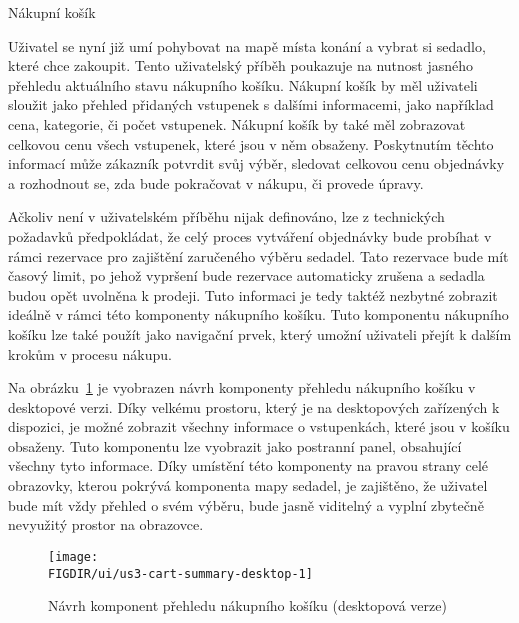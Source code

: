 \begin{subsection}{Nákupní košík}
    \label{subsec:narvh-ui-transformace-uzivatelskych-pribehu-nakupni-kosik}
    \userstoryshoppingcart

    Uživatel se nyní již umí pohybovat na mapě místa konání a vybrat si sedadlo, které chce zakoupit.
    Tento uživatelský příběh poukazuje na nutnost jasného přehledu aktuálního stavu nákupního košíku.
    Nákupní košík by měl uživateli sloužit jako přehled přidaných vstupenek s dalšími informacemi, jako například cena, kategorie, či počet vstupenek.
    Nákupní košík by také měl zobrazovat celkovou cenu všech vstupenek, které jsou v něm obsaženy.
    Poskytnutím těchto informací může zákazník potvrdit svůj výběr, sledovat celkovou cenu objednávky a rozhodnout se, zda bude pokračovat v nákupu, či provede úpravy.

    Ačkoliv není v uživatelském příběhu nijak definováno, lze z technických požadavků předpokládat, že celý proces vytváření objednávky bude probíhat v rámci rezervace pro zajištění zaručeného výběru sedadel.
    Tato rezervace bude mít časový limit, po jehož vypršení bude rezervace automaticky zrušena a sedadla budou opět uvolněna k prodeji.
    Tuto informaci je tedy taktéž nezbytné zobrazit ideálně v rámci této komponenty nákupního košíku.
    Tuto komponentu nákupního košíku lze také použít jako navigační prvek, který umožní uživateli přejít k dalším krokům v procesu nákupu.

    Na obrázku~\ref{fig:us3-cart-summary-desktop} je vyobrazen návrh komponenty přehledu nákupního košíku v desktopové verzi.
    Díky velkému prostoru, který je na desktopových zařízených k dispozici, je možné zobrazit všechny informace o vstupenkách, které jsou v košíku obsaženy.
    Tuto komponentu lze vyobrazit jako postranní panel, obsahující všechny tyto informace.
    Díky umístění této komponenty na pravou strany celé obrazovky, kterou pokrývá komponenta mapy sedadel, je zajištěno, že uživatel bude mít vždy přehled o svém výběru, bude jasně viditelný a vyplní zbytečně nevyužitý prostor na obrazovce.

    \begin{figure}[H]
        \centering
        \caption{Návrh komponent přehledu nákupního košíku (desktopová verze)}
        \texttt{[image: \\FIGDIR/ui/us3-cart-summary-desktop-1]}
        \source{}
        \label{fig:us3-cart-summary-desktop}
    \end{figure}


\end{subsection}
